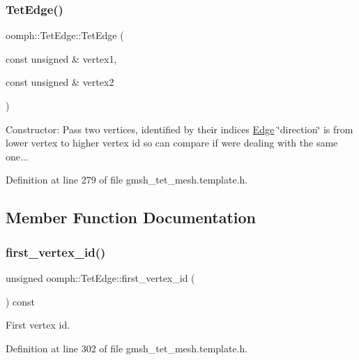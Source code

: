 \subsubsection{\texorpdfstring{Tet\+Edge()}{TetEdge()}}
{\footnotesize\ttfamily oomph\+::\+Tet\+Edge\+::\+Tet\+Edge (\begin{DoxyParamCaption}\item[{const unsigned \&}]{vertex1,  }\item[{const unsigned \&}]{vertex2 }\end{DoxyParamCaption})\hspace{0.3cm}{\ttfamily [inline]}}



Constructor\+: Pass two vertices, identified by their indices \hyperlink{classoomph_1_1Edge}{Edge} \char`\"{}direction\char`\"{} is from lower vertex to higher vertex id so can compare if we\textquotesingle{}re dealing with the same one... 



Definition at line 279 of file gmsh\+\_\+tet\+\_\+mesh.\+template.\+h.



\subsection{Member Function Documentation}
\mbox{\label{classoomph_1_1TetEdge_acc26fa59e15615e1620fade6f9d1bbe1}} 
\subsubsection{\texorpdfstring{first\+\_\+vertex\+\_\+id()}{first\_vertex\_id()}}
{\footnotesize\ttfamily unsigned oomph\+::\+Tet\+Edge\+::first\+\_\+vertex\+\_\+id (\begin{DoxyParamCaption}{ }\end{DoxyParamCaption}) const\hspace{0.3cm}{\ttfamily [inline]}}



First vertex id. 



Definition at line 302 of file gmsh\+\_\+tet\+\_\+mesh.\+template.\+h.



